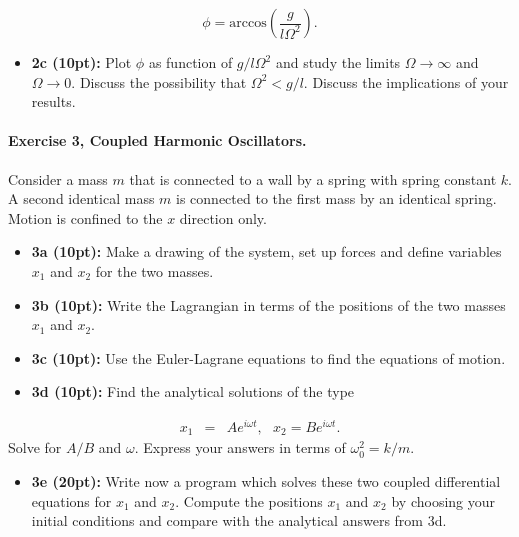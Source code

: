 \documentclass[%
oneside,                 %
final,                   %
10pt]{article}
\begin{document}
\noindent
\[
\phi=\mathrm{arccos}\left(\frac{g}{l\Omega^2}\right).
\]

\begin{itemize}
\item \textbf{2c (10pt):} Plot $\phi$ as function of $g/l\Omega^2$ and study the limits $\Omega\rightarrow \infty$ and $\Omega\rightarrow 0$. Discuss  the possibility that $\Omega^2 < g/l$. Discuss the implications of your results. 
\end{itemize}

\noindent
\paragraph{Exercise 3, Coupled Harmonic Oscillators.}
Consider a mass $m$ that is connected to a wall by a spring with
spring constant $k$. A second identical mass $m$ is connected to the
first mass by an identical spring. Motion is confined to the $x$ direction only.

\begin{itemize}
\item \textbf{3a (10pt):} Make a drawing of the system, set up forces and define variables $x_1$ and $x_2$ for the two masses.

\item \textbf{3b (10pt):} Write the Lagrangian in terms of the positions of the two masses $x_1$ and $x_2$.

\item \textbf{3c (10pt):} Use the Euler-Lagrane equations to find the  equations of motion.

\item \textbf{3d (10pt):} Find the analytical  solutions of the type
\end{itemize}

\noindent
\begin{eqnarray*}
x_1&=&Ae^{i\omega t},~~~x_2=Be^{i\omega t}.
\end{eqnarray*}
Solve for $A/B$ and $\omega$. Express your answers in terms of $\omega_0^2=k/m$.

\begin{itemize}
\item \textbf{3e (20pt):} Write now a program which solves these two coupled differential equations for $x_1$ and $x_2$. Compute the positions $x_1$ and $x_2$ by choosing your initial conditions and compare with the analytical answers from 3d.   
\end{itemize}

\noindent

\end{document}
